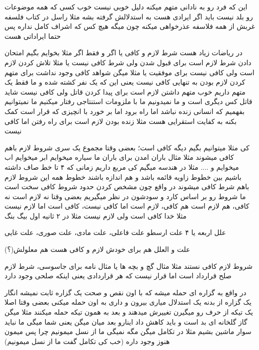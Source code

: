 \documentclass{article}
\begin{document}
		 این که فرد رو به نادانی متهم میکنه دلیل خوبی نیست خوب کسی که همه موضوعات رو بلد نیست باید اگر
		ایرادی هست به استدلالش گرفته بشه مثلا راسل در کتاب فلسفه غربش از همه فلاسفه عذرخواهی میکنه چون میگه هیچ کس که اشراف کامل نداره پس 
		حتما ایراداتی هست
		
		در ریاضات زیاد هست شرط لازم و کافی یا اگر و فقط اگر مثلا بخوایم بگیم امتحان دادن شرط لازم است برای قبول شدن ولی شرط کافی نیست یا مثلا
		تلاش کردن لازم است ولی کافی نیست برای موفقیت یا مثلا میگن شواهد کافی وجود نداشت برای متهم کردن لازم بودن به تنهایی کافی نیست یعنی این
		که یک نفر کشته شده و ما فقط یک متهم داریم خوب متهم داشتن لازم است برای پیدا کردن قاتل ولی کافی نیست شاید قاتل کس دیگری است و ما 
		نمیدونیم
		 ما با ملزومات استنتاجی رفتار میکنیم ما نمیتوانیم بفهمیم که انسانی زنده نباشد
		اما راه برود اما بر خورد با انچیزی که قرار است کمک بکنه به کفایت استقرایی هست مثلا زنده بودن لازم است برای راه رفتن اما کافی نیست
		
		 کی مثلا میتوانیم بگیم دیگه کافی است؛ بعضی وقتا مجموع یک سری شروط لازم باهم کافی میشوند مثلا مثال 
		باران امدن برای باران ما سیاره میخوایم ابر میخوایم اب میخوایم و .... مثلا در هندسه میگیم کی مربع داریم زمانی که ۴ تا خط صاف داشته
		باشیم بین خطوط زاویه قائمه باشد و هم اندازه باشند خطوط همه این شروط لازم باهم شرط کافی میشوند در واقع چون مشخص کردن حدود شروط کافی 
		سخت است ما شروط رو بر اساس کارد و سودشون در نظر میگیریم
		 بعضی وقتا نه لازم است نه کافی، هم لازم است هم کافی، لازم است اما کافی نیست، کافی است اما لازم نیست مثلا خدا کافی است 
		ولی لازم نیست مثلا در ۲ ثانیه اول بیگ بنگ
		
		 علل اربعه یا ۴ علت ارسطو علت فاعلی، علت مادی، علت صوری، علت غایی
		
		علت و العلل هم برای خودش لازم و کافی هست هم معلولش(؟) 
		
		شروط لازم کافی نستند مثلا مثال گچ و بچه ها یا مثال نامه برای جاسوسی، شرط لازم صلح قرارداد است اما قرار نیست که هر قراردادی یعنی اینکه
		صلحی وجود دارد
		
		 در واقع به گزاره ای حمله میشه که با اون نقص و صحت یک گزاره ثابت نمیشه انگار یک گزاره از 
		بدنه یک استدلال میاری بیرون و داری به اون حمله میکنی بعضی وقتا اصلا یک تیکه از حرف رو میگیرن تغییرش میدهند و بعد به همون تیکه حمله
		میکنند مثلا میگن گاز گلخانه ای بد است و باید کاهش داد اینارو بعد میان میگن یعنی شما میگی ما نباید سوار ماشین بشیم مثلا در تکامل 
		میگن مگه نمیگی ما از نسل میمونیم چرا پس میمون هنوز وجود داره (خب کی تکامل گفت ما از نسل میمونیم)
		
\end{document}
